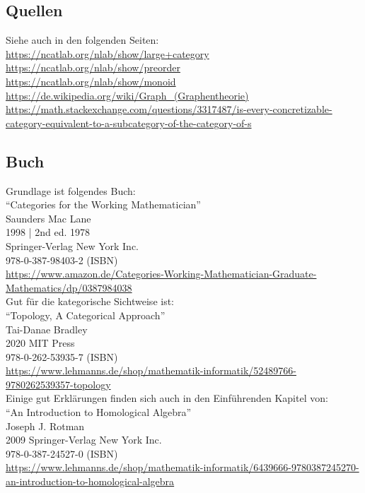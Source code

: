 \documentclass[a4paper]{amsart}
\theoremstyle{definition}
\begin{document}
\subsection*{Quellen}
Siehe auch in den folgenden Seiten:\\
\url{https://ncatlab.org/nlab/show/large+category}\\
\url{https://ncatlab.org/nlab/show/preorder}\\
\url{https://ncatlab.org/nlab/show/monoid}\\
\url{https://de.wikipedia.org/wiki/Graph_(Graphentheorie)}\\
{\tiny\url{https://math.stackexchange.com/questions/3317487/is-every-concretizable-category-equivalent-to-a-subcategory-of-the-category-of-s}}

\subsection*{Buch}
Grundlage ist folgendes Buch:\\
"`Categories for the Working Mathematician"'\\
Saunders Mac Lane\\
1998 | 2nd ed. 1978\\
Springer-Verlag New York Inc.\\
978-0-387-98403-2 (ISBN)\\
{\tiny
   \url{https://www.amazon.de/Categories-Working-Mathematician-Graduate-Mathematics/dp/0387984038}}\\

Gut für die kategorische Sichtweise ist:\\
"`Topology, A Categorical Approach"'\\
Tai-Danae Bradley\\
2020 MIT Press\\
978-0-262-53935-7 (ISBN)\\
{\tiny
\url{https://www.lehmanns.de/shop/mathematik-informatik/52489766-9780262539357-topology}}\\

Einige gut Erklärungen finden sich auch in den Einführenden Kapitel von:\\
"`An Introduction to Homological Algebra"'\\
Joseph J. Rotman\\
2009 Springer-Verlag New York Inc.\\
978-0-387-24527-0 (ISBN)\\
{\tiny \url{https://www.lehmanns.de/shop/mathematik-informatik/6439666-9780387245270-an-introduction-to-homological-algebra}}\\
\end{document}
